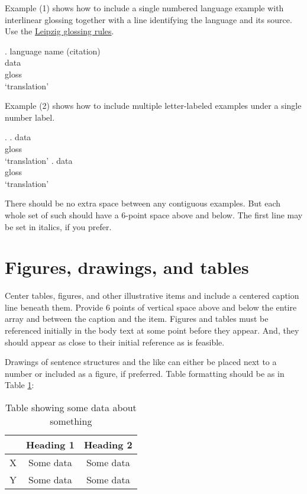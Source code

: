\documentclass[12pt,letterpaper]{article}
\begin{document}
Example (1) shows how to include a single numbered language example with interlinear glossing together with a line identifying the language and its source. Use the \href{http://www.eva.mpg.de/lingua/resources/glossing-rules.php}{Leipzig glossing rules}.

\ex. language name (citation) \label{label}\\
data\\
gloss\\
`translation' 

Example  (2) shows how to include multiple letter-labeled examples under a single number label.

\ex. \label{label2} 
\ag. data  \\
gloss\\
`translation' 
\bg. data\\
gloss\\
`translation' 

There should be no extra space between any contiguous examples. But each whole set of such should have a 6-point space above and below. The first line may be set in italics, if you prefer.

 
 
\section{Figures, drawings, and tables}

Center tables, figures, and other illustrative items and include a centered caption line beneath them. Provide 6 points of vertical space above and below the entire array and between the caption and the item. Figures and tables must be referenced initially in the body text at some point before they appear. And, they should appear as close to their initial reference as is feasible.

Drawings of sentence structures and the like can either be placed next to a number or included as a figure, if preferred. Table formatting should be as in Table \ref{t:table}: 

\begin{table}[h]
\centering
	\begin{tabular}{l c c}
	& Heading 1 & Heading 2\\
	\hline
	X &  Some data & Some data\\
	Y & Some data & Some data \\
	\hline
	\end{tabular}
\caption{Table showing some data about something \label{t:table}}
\end{table}
\end{document}
